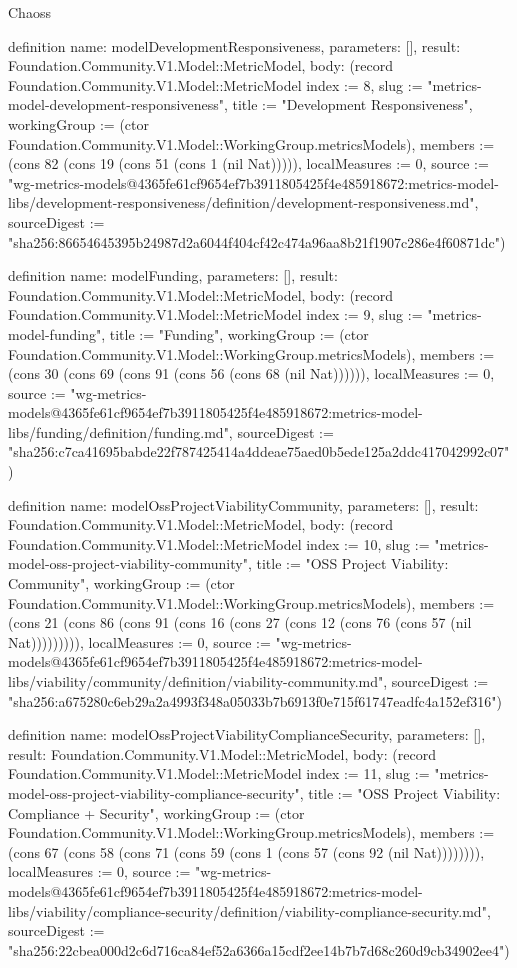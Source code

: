 \begin{lexlean}{Chaoss}
\begin{semanticmodule}
definition{
  name: modelDevelopmentResponsiveness,
  parameters: [],
  result: Foundation.Community.V1.Model::MetricModel,
  body: (record Foundation.Community.V1.Model::MetricModel {index := 8, slug := "metrics-model-development-responsiveness", title := "Development Responsiveness", workingGroup := (ctor Foundation.Community.V1.Model::WorkingGroup.metricsModels), members := (cons 82 (cons 19 (cons 51 (cons 1 (nil Nat))))), localMeasures := 0, source := "wg-metrics-models@4365fe61cf9654ef7b3911805425f4e485918672:metrics-model-libs/development-responsiveness/definition/development-responsiveness.md", sourceDigest := "sha256:86654645395b24987d2a6044f404cf42c474a96aa8b21f1907c286e4f60871dc"})
}

definition{
  name: modelFunding,
  parameters: [],
  result: Foundation.Community.V1.Model::MetricModel,
  body: (record Foundation.Community.V1.Model::MetricModel {index := 9, slug := "metrics-model-funding", title := "Funding", workingGroup := (ctor Foundation.Community.V1.Model::WorkingGroup.metricsModels), members := (cons 30 (cons 69 (cons 91 (cons 56 (cons 68 (nil Nat)))))), localMeasures := 0, source := "wg-metrics-models@4365fe61cf9654ef7b3911805425f4e485918672:metrics-model-libs/funding/definition/funding.md", sourceDigest := "sha256:c7ca41695babde22f787425414a4ddeae75aed0b5ede125a2ddc417042992c07"})
}

definition{
  name: modelOssProjectViabilityCommunity,
  parameters: [],
  result: Foundation.Community.V1.Model::MetricModel,
  body: (record Foundation.Community.V1.Model::MetricModel {index := 10, slug := "metrics-model-oss-project-viability-community", title := "OSS Project Viability: Community", workingGroup := (ctor Foundation.Community.V1.Model::WorkingGroup.metricsModels), members := (cons 21 (cons 86 (cons 91 (cons 16 (cons 27 (cons 12 (cons 76 (cons 57 (nil Nat))))))))), localMeasures := 0, source := "wg-metrics-models@4365fe61cf9654ef7b3911805425f4e485918672:metrics-model-libs/viability/community/definition/viability-community.md", sourceDigest := "sha256:a675280c6eb29a2a4993f348a05033b7b6913f0e715f61747eadfc4a152ef316"})
}

definition{
  name: modelOssProjectViabilityComplianceSecurity,
  parameters: [],
  result: Foundation.Community.V1.Model::MetricModel,
  body: (record Foundation.Community.V1.Model::MetricModel {index := 11, slug := "metrics-model-oss-project-viability-compliance-security", title := "OSS Project Viability: Compliance + Security", workingGroup := (ctor Foundation.Community.V1.Model::WorkingGroup.metricsModels), members := (cons 67 (cons 58 (cons 71 (cons 59 (cons 1 (cons 57 (cons 92 (nil Nat)))))))), localMeasures := 0, source := "wg-metrics-models@4365fe61cf9654ef7b3911805425f4e485918672:metrics-model-libs/viability/compliance-security/definition/viability-compliance-security.md", sourceDigest := "sha256:22cbea000d2c6d716ca84ef52a6366a15cdf2ee14b7b7d68c260d9cb34902ee4"})
}


\end{semanticmodule}
\end{lexlean}
